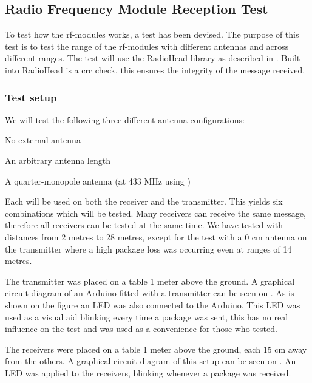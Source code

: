 \subsection{Radio Frequency Module Reception Test} %
\label{cha:radio_frequency_module_reception_test}
To test how the \gls{rf}-modules works, a test has been devised. 
The purpose of this test is to test the range of the \gls{rf}-modules with different antennas and across different ranges. 
The test will use the RadioHead library as described in . 
Built into RadioHead is a \gls{crc} check, this ensures the integrity of the message received. 

\subsubsection*{Test setup}
We will test the following three different antenna configurations: 
\begin{description}[labelindent=\parindent, labelwidth=\widthof{\bfseries 17.3 cm}, align=parright]
    \item[0 cm] No external antenna
    \item[12 cm] An arbitrary antenna length
    \item[17.3 cm] A quarter-monopole antenna (at 433 MHz using )  
\end{description}
Each will be used on both the receiver and the transmitter. 
This yields six combinations which will be tested. 
Many receivers can receive the same message, therefore all receivers can be tested at the same time. 
We have tested with distances from 2 metres to 28 metres, except for the test with a 0 cm antenna on the transmitter where a high package loss was occurring even at ranges of 14 metres. 

The transmitter was placed on a table 1 meter above the ground.
A graphical circuit diagram of an Arduino fitted with a transmitter can be seen on .
As is shown on the figure an LED was also connected to the Arduino.
This LED was used as a visual aid blinking every time a package was sent, this has no real influence on the test and was used as a convenience for those who tested.

The receivers were placed on a table 1 meter above the ground, each 15 cm away from the others.
A graphical circuit diagram of this setup can be seen on .
An LED was applied to the receivers, blinking whenever a package was received.

